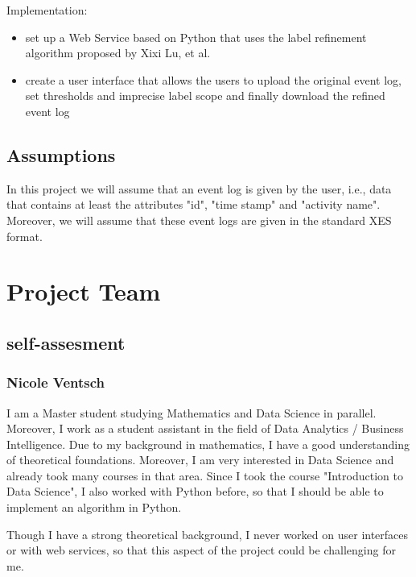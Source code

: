 \documentclass[12pt,bibtotoc,liststotoc,paper=a4,headings=small]{paper}
\begin{document}
Implementation:
\begin{itemize}
	\item set up a Web Service based on Python that uses the label refinement algorithm proposed by Xixi Lu, et al.
	\item create a user interface that allows the users to upload the original event log, set thresholds and imprecise label scope and finally download the refined event log
\end{itemize}

\subsection{Assumptions}

In this project we will assume that an event log is given by the user, i.e., data that contains at least the attributes "id", "time stamp" and "activity name". Moreover, we will assume that these event logs are given in the standard XES format. 


\section{Project Team}
\subsection{self-assesment}

\subsubsection{Nicole Ventsch}

I am a Master student studying Mathematics and Data Science in parallel.  Moreover, I work as a student assistant in the field of Data Analytics / Business Intelligence. Due to my background in mathematics, I have a good understanding of theoretical foundations. Moreover, I am very interested in Data Science and already took many courses in that area. Since I took the course "Introduction to Data Science", I also worked with Python before, so that I should be able to implement an algorithm in Python.

Though I have a strong theoretical background, I never worked on user interfaces or with web services, so that this aspect of the project could be challenging for me. 

 
\end{document}
